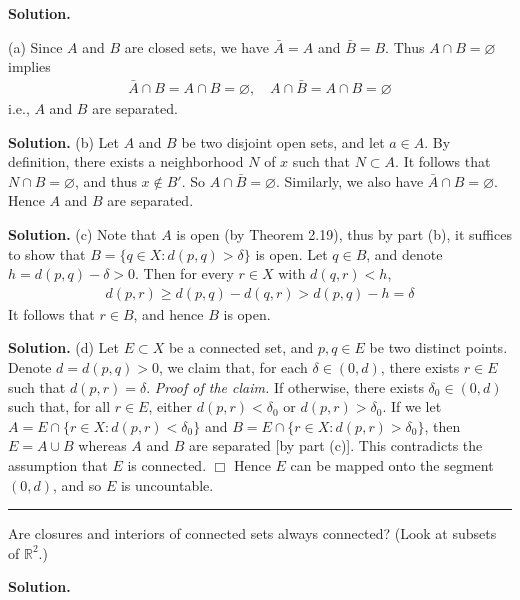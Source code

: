 \documentclass[12pt]{article}
\theoremstyle{definition}
\begin{document}
\smallskip
\noindent\textbf{Solution.}\quad

(a) Since $A$ and $B$ are closed sets, we have $\bar{A}=A$ and $\bar{B}=B$. Thus $A\cap B=\varnothing$ implies
\begin{align*}
\bar{A}\cap B=A\cap B=\varnothing,\quad
A\cap \bar{B}=A\cap B=\varnothing
\end{align*}
i.e., $A$ and $B$ are separated.

\smallskip
\noindent\textbf{Solution.}\quad
(b) Let $A$ and $B$ be two disjoint open sets, and let $a\in A$. By definition, there exists a neighborhood $N$ of $x$ such that $N\subset A$. It follows that $N\cap B=\varnothing$, and thus $x\notin B'$. So $A\cap\bar{B}=\varnothing$. Similarly, we also have $\bar{A}\cap B=\varnothing$. Hence $A$ and $B$ are separated.

\smallskip
\noindent\textbf{Solution.}\quad
(c) Note that $A$ is open (by Theorem 2.19), thus by part (b), it suffices to show that $B=\{q\in X:d(p,q)>\delta\}$ is open. Let $q\in B$, and denote $h=d(p,q)-\delta>0$. Then for every $r\in X$ with $d(q,r)<h$,
\begin{align*}
d(p,r)
\ge d(p,q)-d(q,r)
>d(p,q)-h
=\delta
\end{align*}
It follows that $r\in B$, and hence $B$ is open.

\smallskip
\noindent\textbf{Solution.}\quad
(d) Let $E\subset X$ be a connected set, and $p,q\in E$ be two distinct points. Denote $d=d(p,q)>0$, we claim that, for each $\delta\in(0,d)$, there exists $r\in E$ such that $d(p,r)=\delta$.
\textit{Proof of the claim.} If otherwise, there exists $\delta_0\in(0,d)$ such that, for all $r\in E$, either $d(p,r)<\delta_0$ or $d(p,r)>\delta_0$. If we let $A=E\cap\{r\in X:d(p,r)<\delta_0\}$ and $B=E\cap\{r\in X:d(p,r)>\delta_0\}$, then $E=A\cup B$ whereas $A$ and $B$ are separated [by part (c)]. This contradicts the assumption that $E$ is connected. $\Box$
Hence $E$ can be mapped onto the segment $(0,d)$, and so $E$ is uncountable.



\bigskip\noindent\hrule\bigskip

Are closures and interiors of connected sets always connected? (Look at subsets of $\mathbb{R}^2$.)

\smallskip
\noindent\textbf{Solution.}\quad
\end{document}
